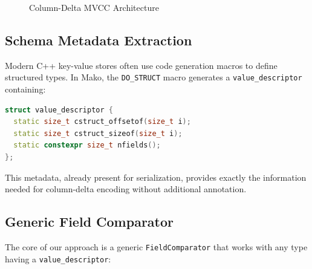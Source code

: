 \documentclass[letterpaper,twocolumn,10pt]{article}
\begin{document}
\begin{figure}[t]
\centering
{}
\caption{Column-Delta MVCC Architecture}
\label{fig:architecture}
\end{figure}

\subsection{Schema Metadata Extraction}

Modern C++ key-value stores often use code generation macros to define structured types. In Mako, the \texttt{DO\_STRUCT} macro generates a \texttt{value\_descriptor} containing:

\begin{lstlisting}[language=C++,basicstyle=\small\ttfamily]
struct value_descriptor {
  static size_t cstruct_offsetof(size_t i);
  static size_t cstruct_sizeof(size_t i);
  static constexpr size_t nfields();
};
\end{lstlisting}

This metadata, already present for serialization, provides exactly the information needed for column-delta encoding without additional annotation.

\subsection{Generic Field Comparator}

The core of our approach is a generic \texttt{FieldComparator} that works with any type having a \texttt{value\_descriptor}:
\end{document}
